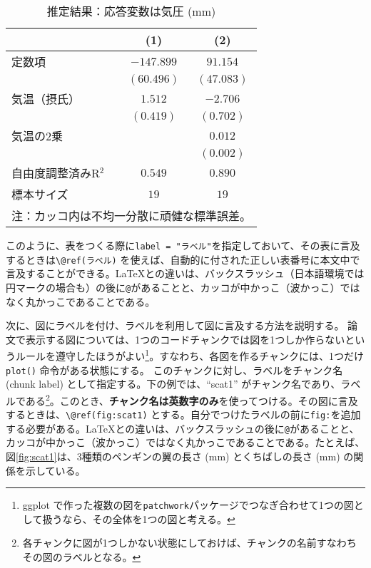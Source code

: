 \documentclass[lualatex,
               a4paper,
               10.5pt,
               ja=standard,
               jafont=ipaex]{bxjsarticle}
\begin{document}
\begin{table}[t]
\caption{推定結果：応答変数は気圧 (mm)}
\begin{center}
\begin{tabular}{l c c}
\hline
 & (1) & (2) \\
\hline
定数項          & $-147.899$ & $91.154$   \\
             & $(60.496)$ & $(47.083)$ \\
気温（摂氏）       & $1.512$    & $-2.706$   \\
             & $(0.419)$  & $(0.702)$  \\
気温の2乗        &            & $0.012$    \\
             &            & $(0.002)$  \\
\hline
自由度調整済みR$^2$ & $0.549$    & $0.890$    \\
標本サイズ        & $19$       & $19$       \\
\hline
\multicolumn{3}{l}{\scriptsize{注：カッコ内は不均一分散に頑健な標準誤差。}}
\end{tabular}
\label{tab:reg1}
\end{center}
\end{table}

このように、表をつくる際に\texttt{label\ =\ "ラベル"}を指定しておいて、その表に言及するときは\texttt{\textbackslash{}@ref(ラベル)} を使えば、自動的に付された正しい表番号に本文中で言及することができる。\LaTeX との違いは、バックスラッシュ（日本語環境では円マークの場合も）の後に\texttt{@}があることと、カッコが中かっこ（波かっこ）ではなく丸かっこであることである。

次に、図にラベルを付け、ラベルを利用して図に言及する方法を説明する。
論文で表示する図については、1つのコードチャンクでは図を1つしか作らないというルールを遵守したほうがよい\footnote{ggplot で作った複数の図を\texttt{patchwork}パッケージでつなぎ合わせて1つの図として扱うなら、その全体を1つの図と考える。}。すなわち、各図を作るチャンクには、1つだけ\texttt{plot()} 命令がある状態にする。
このチャンクに対し、ラベルをチャンク名 (chunk label) として指定する。下の例では、``scat1'' がチャンク名であり、ラベルである\footnote{各チャンクに図が1つしかない状態にしておけば、チャンクの名前すなわちその図のラベルとなる。}。このとき、\textbf{チャンク名は英数字のみ}を使ってつける。その図に言及するときは、\texttt{\textbackslash{}@ref(fig:scat1)} とする。自分でつけたラベルの前に\texttt{fig:}を追加する必要がある。\LaTeX との違いは、バックスラッシュの後に\texttt{@}があることと、カッコが中かっこ（波かっこ）ではなく丸かっこであることである。たとえば、図\ref{fig:scat1}は、3種類のペンギンの翼の長さ (mm) とくちばしの長さ (mm) の関係を示している。
\end{document}
